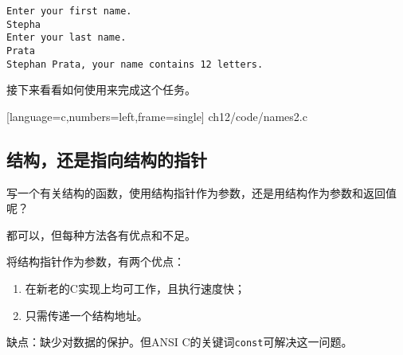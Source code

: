 \begin{frame}[fragile]\ft{\subsecname}
\begin{lstlisting}[backgroundcolor=\color{blue!20}]
Enter your first name.
Stepha
Enter your last name.
Prata
Stephan Prata, your name contains 12 letters.
\end{lstlisting}
\end{frame}

\begin{frame}[fragile]\ft{\subsecname}
  接下来看看如何使用来完成这个任务。
\end{frame}

\begin{frame}\ft{\subsecname}
  
  [language=c,numbers=left,frame=single]  
  {ch12/code/names2.c}
\end{frame}


\subsection{结构，还是指向结构的指针}
\begin{frame}[fragile]\ft{\subsecname}
\begin{li}
写一个有关结构的函数，使用结构指针作为参数，还是用结构作为参数和返回值呢？
\end{li}  \vspace{0.1in}

都可以，但每种方法各有优点和不足。           
\end{frame}

\begin{frame}[fragile]\ft{\subsecname}
将结构指针作为参数，有两个优点：\vspace{0.1in}

\begin{enumerate}
\item 在新老的C实现上均可工作，且执行速度快；\\[0.1in]
\item 只需传递一个结构地址。\\[0.1in]
\end{enumerate}
缺点：缺少对数据的保护。但ANSI C的关键词\verb|const|可解决这一问题。
\end{frame}

